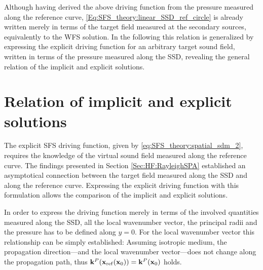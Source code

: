 Although having derived the above driving function from the pressure measured along the reference curve, \eqref{Eq:SFS_theory:linear_SSD_ref_circle} is already written merely in terms of the target field measured at the secondary sources, equivalently to the WFS solution.
In the following this relation is generalized by expressing the explicit driving function for an arbitrary target sound field, written in terms of the pressure measured along the SSD, revealing the general relation of the implicit and explicit solutions.

\section{Relation of implicit and explicit solutions}

The explicit SFS driving function, given by \eqref{eq:SFS_theory:spatial_sdm_2}, requires the knowledge of the virtual sound field measured along the reference curve.
The findings presented in Section \ref{Sec:HF:RayleighSPA} established an asymptotical connection between the target field measured along the SSD and along the reference curve.
Expressing the explicit driving function with this formulation allows the comparison of the implicit and explicit solutions.

In order to express the driving function merely in terms of the involved quantities measured along the SSD, all the local wavenumber vector, the principal radii and the pressure has to be defined along $y=0$.
For the local wavenumber vector this relationship can be simply established: Assuming isotropic medium, the propagation direction---and the local wavenumber vector---does not change along the propagation path, thus $\mathbf{k}^P(\mathbf{x}_{\mathrm{ref}}(\mathbf{x}_0)) = \mathbf{k}^P(\mathbf{x}_0)$ holds.

